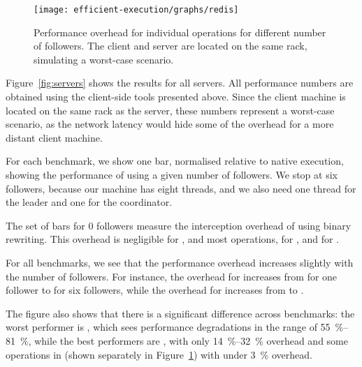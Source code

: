 \begin{figure}[!t]
 \centering
 \texttt{[image: efficient-execution/graphs/redis]}
 \caption{Performance overhead for individual \redis operations for different
 number of followers. The client and server are located on the same rack,
 simulating a worst-case scenario.}
 \label{fig:redis-ops}
\end{figure}

Figure~\ref{fig:servers} shows the results for all servers. All
performance numbers are obtained using the client-side tools presented
above.  Since the client machine is located on the same rack as the
server, these numbers represent a worst-case scenario, as the network
latency would hide some of the overhead for a more distant client
machine.


For each benchmark, we show one bar, normalised relative to native
execution, showing the performance of \varan using a given number of
followers.  We stop at six followers, because our machine has eight
threads, and we also need one thread for the leader and one for the
coordinator.  

The set of bars for 0 followers measure the interception overhead
of \varan using binary rewriting.  This overhead is negligible for
\lighttpdtwo, \memcached and most \redis operations, \nginxIntercept for
\nginx, and \beanstalkdIntercept for \beanstalkd.

For all benchmarks, we see that the performance overhead increases
slightly with the number of followers.  For instance, the overhead for
\beanstalkd increases from \beanstalkdOneFollower for one follower to
\beanstalkdSixFollowers for six followers, while the overhead for
\memcached increases from \memcachedOneFollower to
\memcachedSixFollowers.

The figure also shows that there is a significant difference across
benchmarks: the worst performer is \beanstalkd, which sees performance
degradations in the range of \SIrange{55}{81}{\percent}, while the best performers are
\memcached, with only \SIrange{14}{32}{\percent} overhead and some operations in \redis
(shown separately in Figure~\ref{fig:redis-ops})
with under \SI{3}{\percent} overhead.
